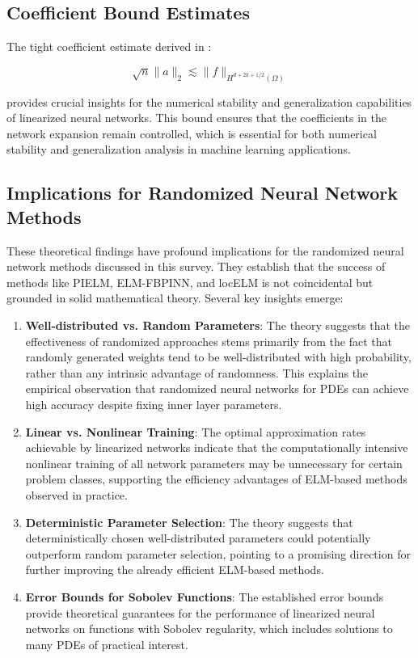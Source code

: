 \documentclass[11pt]{article}
\begin{document}
\subsection{Coefficient Bound Estimates}

The tight coefficient estimate derived in \citep{LiuMaoXu2025}:

\begin{equation}
\sqrt{n}\|a\|_2 \lesssim \|f\|_{H^{d+2k+1/2}(\Omega)}
\end{equation}

provides crucial insights for the numerical stability and generalization capabilities of linearized neural networks. This bound ensures that the coefficients in the network expansion remain controlled, which is essential for both numerical stability and generalization analysis in machine learning applications.

\subsection{Implications for Randomized Neural Network Methods}

These theoretical findings have profound implications for the randomized neural network methods discussed in this survey. They establish that the success of methods like PIELM, ELM-FBPINN, and locELM is not coincidental but grounded in solid mathematical theory. Several key insights emerge:

\begin{enumerate}
    \item \textbf{Well-distributed vs. Random Parameters}: The theory suggests that the effectiveness of randomized approaches stems primarily from the fact that randomly generated weights tend to be well-distributed with high probability, rather than any intrinsic advantage of randomness. This explains the empirical observation that randomized neural networks for PDEs can achieve high accuracy despite fixing inner layer parameters.
    
    \item \textbf{Linear vs. Nonlinear Training}: The optimal approximation rates achievable by linearized networks indicate that the computationally intensive nonlinear training of all network parameters may be unnecessary for certain problem classes, supporting the efficiency advantages of ELM-based methods observed in practice.
    
    \item \textbf{Deterministic Parameter Selection}: The theory suggests that deterministically chosen well-distributed parameters could potentially outperform random parameter selection, pointing to a promising direction for further improving the already efficient ELM-based methods.
    
    \item \textbf{Error Bounds for Sobolev Functions}: The established error bounds provide theoretical guarantees for the performance of linearized neural networks on functions with Sobolev regularity, which includes solutions to many PDEs of practical interest.
\end{enumerate}
\end{document}
